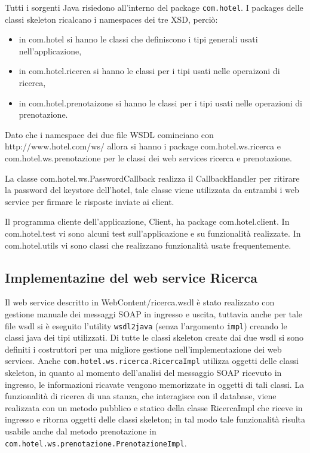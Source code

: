 \documentclass[a4paper]{article}
\begin{document}
Tutti i sorgenti Java risiedono all'interno del package \verb'com.hotel'. I packages delle classi skeleton ricalcano i namespaces dei tre XSD, perci\`o:
\begin{itemize}
\item in com.hotel si hanno le classi che definiscono i tipi generali usati nell'applicazione,
\item in com.hotel.ricerca si hanno le classi per i tipi usati nelle operaizoni di ricerca,
\item in com.hotel.prenotaizone si hanno le classi per i tipi usati nelle operazioni di prenotazione.
\end{itemize}
Dato che i namespace dei due file WSDL cominciano con
http://www.hotel.com/ws/ allora si hanno i package
com.hotel.ws.ricerca e com.hotel.ws.prenotazione per le classi dei web
services ricerca e prenotazione.

La classe com.hotel.ws.PasswordCallback realizza il CallbackHandler
per ritirare la password del keystore dell'hotel, tale classe viene
utilizzata da entrambi i web service per firmare le risposte inviate
ai client.

Il programma cliente dell'applicazione, Client, ha package
com.hotel.client. In com.hotel.test vi sono alcuni test
sull'applicazione e su funzionalit\`a realizzate. In com.hotel.utils vi
sono classi che realizzano funzionalit\`a usate frequentemente.

\subsection{Implementazine del web service Ricerca}
\label{sec:realizzazione.ricerca}
Il web service descritto in WebContent/ricerca.wsdl \`e stato
realizzato con gestione manuale dei messaggi SOAP in ingresso e
uscita, tuttavia anche per tale file wsdl si \`e eseguito l'utility
\verb'wsdl2java' (senza l'argomento \verb'impl') creando le classi
java dei tipi utilizzati. Di tutte le classi skeleton create dai due
wsdl si sono definiti i costruttori per una migliore gestione
nell'implementazione dei web services. Anche
\verb'com.hotel.ws.ricerca.RicercaImpl' utilizza oggetti delle classi
skeleton, in quanto al momento dell'analisi del messaggio SOAP
ricevuto in ingresso, le informazioni ricavate vengono memorizzate in
oggetti di tali classi. La funzionalit\`a di ricerca di una stanza,
che interagisce con il database, viene realizzata con un metodo
pubblico e statico della classe RicercaImpl che riceve in ingresso e
ritorna oggetti delle classi skeleton; in tal modo tale funzionalit\`a
risulta usabile anche dal metodo prenotazione in
\verb'com.hotel.ws.prenotazione.PrenotazioneImpl'.
\end{document}

